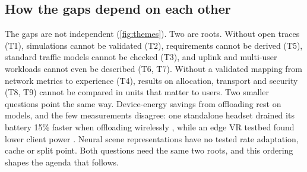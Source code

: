 \subsection{How the gaps depend on each other}
The gaps are not independent (\cref{fig:themes}). Two are roots. Without open traces (T1), simulations
cannot be validated (T2), requirements cannot be derived (T5), standard traffic models cannot be checked
(T3), and uplink and multi-user workloads cannot even be described (T6, T7). Without a validated mapping
from network metrics to experience (T4), results on allocation, transport and security (T8, T9) cannot
be compared in units that matter to users. Two smaller questions point the same way. Device-energy
savings from offloading rest on models, and the few measurements disagree: one standalone headset
drained its battery 15\% faster when offloading wirelessly \cite{W4362489903}, while an edge VR testbed
found lower client power \cite{W4296339041}. Neural scene representations have no tested rate
adaptation, cache or split point. Both questions need the same two roots, and this ordering shapes the
agenda that follows.
